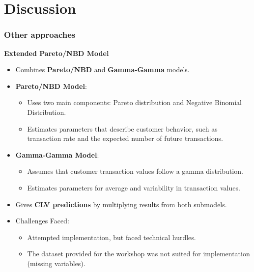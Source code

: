 \documentclass[aspectratio=169,xcolor=x11names,compress]{beamer}
\begin{document}
\section{Discussion}

\begin{frame}
\frametitle{Other approaches}

\textbf{Extended Pareto/NBD Model}

\begin{itemize}
  \item Combines \textbf{Pareto/NBD} and \textbf{Gamma-Gamma} models.
  
  \item \textbf{Pareto/NBD Model}:
  \begin{itemize}
    \item Uses two main components: Pareto distribution and Negative Binomial Distribution.
    \item Estimates parameters that describe customer behavior, such as transaction rate and the expected number of future transactions.
  \end{itemize}
  
  \item \textbf{Gamma-Gamma Model}:
  \begin{itemize}
    \item Assumes that customer transaction values follow a gamma distribution.
    \item Estimates parameters for average and variability in transaction values.
  \end{itemize}
  
  \item Gives \textbf{CLV predictions} by multiplying results from both submodels.
  
  \item Challenges Faced:
  \begin{itemize}
    \item Attempted implementation, but faced technical hurdles.
    \item The dataset provided for the workshop was not suited for implementation (missing variables).
  \end{itemize}
\end{itemize}

\end{frame}
\end{document}

